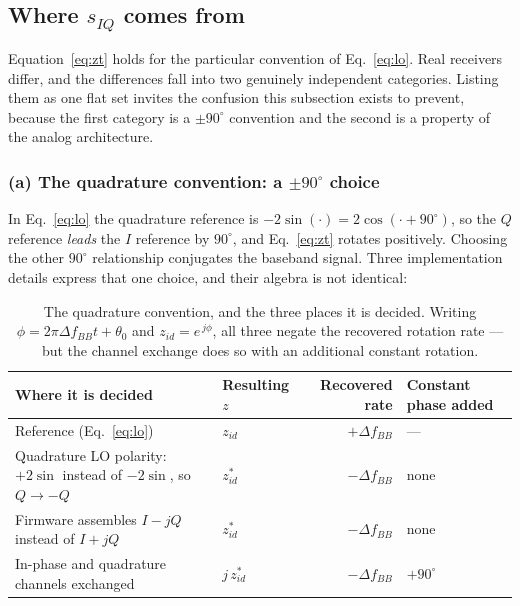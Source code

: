 \documentclass[11pt,a4paper]{article}
\begin{document}
\subsection{Where $s_{IQ}$ comes from}
\label{sec:siq}

Equation~\eqref{eq:zt} holds for the particular convention of Eq.~\eqref{eq:lo}. Real receivers
differ, and the differences fall into two genuinely independent categories. Listing them as one flat
set invites the confusion this subsection exists to prevent, because the first category is a
$\pm90^{\circ}$ convention and the second is a property of the analog architecture.

\subsubsection*{(a) The quadrature convention: a $\pm 90^{\circ}$ choice}

In Eq.~\eqref{eq:lo} the quadrature reference is $-2\sin(\cdot) = 2\cos(\cdot + 90^{\circ})$, so the
$Q$ reference \emph{leads} the $I$ reference by $90^{\circ}$, and Eq.~\eqref{eq:zt} rotates
positively. Choosing the other $90^{\circ}$ relationship conjugates the baseband signal. Three
implementation details express that one choice, and their algebra is not identical:

\begin{table}[h]
\caption{The quadrature convention, and the three places it is decided. Writing
$\phi = 2\pi\Delta f_{BB}t + \theta_0$ and $z_{id} = e^{\,j\phi}$, all three negate the recovered
rotation rate --- but the channel exchange does so with an additional constant rotation.}
\label{tab:siq}
\centering\small
\begin{tabular}{@{}L{46mm}L{30mm}rL{34mm}@{}}
\toprule
Where it is decided & Resulting $z$ & Recovered rate & Constant phase added \\
\midrule
Reference (Eq.~\eqref{eq:lo}) & $z_{id}$ & $+\Delta f_{BB}$ & --- \\
Quadrature LO polarity: $+2\sin$ instead of $-2\sin$, so $Q\to-Q$ & $z_{id}^{*}$ & $-\Delta f_{BB}$ & none \\
Firmware assembles $I-jQ$ instead of $I+jQ$ & $z_{id}^{*}$ & $-\Delta f_{BB}$ & none \\
In-phase and quadrature channels exchanged & $j\,z_{id}^{*}$ & $-\Delta f_{BB}$ & $+90^{\circ}$ \\
\bottomrule
\end{tabular}
\end{table}
\end{document}
